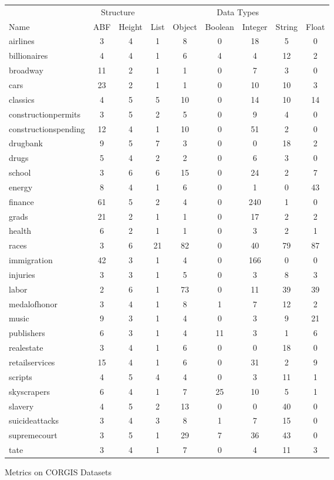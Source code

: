 \documentclass{sig-alternate}
\begin{document}
\begin{figure}
\begin{tabular}{ l | c c | c c c c c c|}
 & \multicolumn{2}{|c|}{Structure} & \multicolumn{6}{|c|}{Data Types} \\
Name & ABF & Height & List & Object & Boolean & Integer & String & Float \\\hline
airlines & 3 & 4 & 1 & 8 & 0 & 18 & 5 & 0\\
billionaires & 4 & 4 & 1 & 6 & 4 & 4 & 12 & 2\\
broadway & 11 & 2 & 1 & 1 & 0 & 7 & 3 & 0\\
cars & 23 & 2 & 1 & 1 & 0 & 10 & 10 & 3\\
classics & 4 & 5 & 5 & 10 & 0 & 14 & 10 & 14\\
constructionpermits & 3 & 5 & 2 & 5 & 0 & 9 & 4 & 0\\
constructionspending & 12 & 4 & 1 & 10 & 0 & 51 & 2 & 0\\
drugbank & 9 & 5 & 7 & 3 & 0 & 0 & 18 & 2\\
drugs & 5 & 4 & 2 & 2 & 0 & 6 & 3 & 0\\
school & 3 & 6 & 6 & 15 & 0 & 24 & 2 & 7\\
energy & 8 & 4 & 1 & 6 & 0 & 1 & 0 & 43\\
finance & 61 & 5 & 2 & 4 & 0 & 240 & 1 & 0\\
grads & 21 & 2 & 1 & 1 & 0 & 17 & 2 & 2\\
health & 6 & 2 & 1 & 1 & 0 & 3 & 2 & 1\\
races & 3 & 6 & 21 & 82 & 0 & 40 & 79 & 87\\
immigration & 42 & 3 & 1 & 4 & 0 & 166 & 0 & 0\\
injuries & 3 & 3 & 1 & 5 & 0 & 3 & 8 & 3\\
labor & 2 & 6 & 1 & 73 & 0 & 11 & 39 & 39\\
medalofhonor & 3 & 4 & 1 & 8 & 1 & 7 & 12 & 2\\
music & 9 & 3 & 1 & 4 & 0 & 3 & 9 & 21\\
publishers & 6 & 3 & 1 & 4 & 11 & 3 & 1 & 6\\
realestate & 3 & 4 & 1 & 6 & 0 & 0 & 18 & 0\\
retailservices & 15 & 4 & 1 & 6 & 0 & 31 & 2 & 9\\
scripts & 4 & 5 & 4 & 4 & 0 & 3 & 11 & 1\\
skyscrapers & 6 & 4 & 1 & 7 & 25 & 10 & 5 & 1\\
slavery & 4 & 5 & 2 & 13 & 0 & 0 & 40 & 0\\
suicideattacks & 3 & 4 & 3 & 8 & 1 & 7 & 15 & 0\\
supremecourt & 3 & 5 & 1 & 29 & 7 & 36 & 43 & 0\\
tate & 3 & 4 & 1 & 7 & 0 & 4 & 11 & 3\\
\end{tabular}
    \caption{Metrics on CORGIS Datasets}
    \label{fig:corgis-metrics}
\end{figure}
\end{document}
